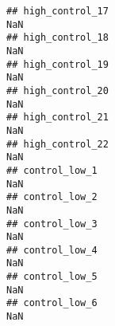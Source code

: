 \documentclass[
]{article}
\begin{document}
\begin{verbatim}
## high_control_17                                                                                                                                                                                                               NaN
## high_control_18                                                                                                                                                                                                               NaN
## high_control_19                                                                                                                                                                                                               NaN
## high_control_20                                                                                                                                                                                                               NaN
## high_control_21                                                                                                                                                                                                               NaN
## high_control_22                                                                                                                                                                                                               NaN
## control_low_1                                                                                                                                                                                                                 NaN
## control_low_2                                                                                                                                                                                                                 NaN
## control_low_3                                                                                                                                                                                                                 NaN
## control_low_4                                                                                                                                                                                                                 NaN
## control_low_5                                                                                                                                                                                                                 NaN
## control_low_6                                                                                                                                                                                                                 NaN

\end{verbatim}
\end{document}
